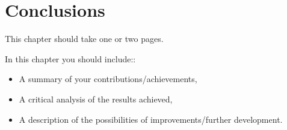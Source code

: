 \chapter{Conclusions}
\pagestyle{fancy}

{\color{blue} This chapter should take one or two pages.\\}

In this chapter you should include::
\begin{itemize}
	\item A summary of your contributions/achievements,
    \item  A critical analysis of the results achieved,
    \item  A description of the possibilities of improvements/further development.
\end{itemize}

